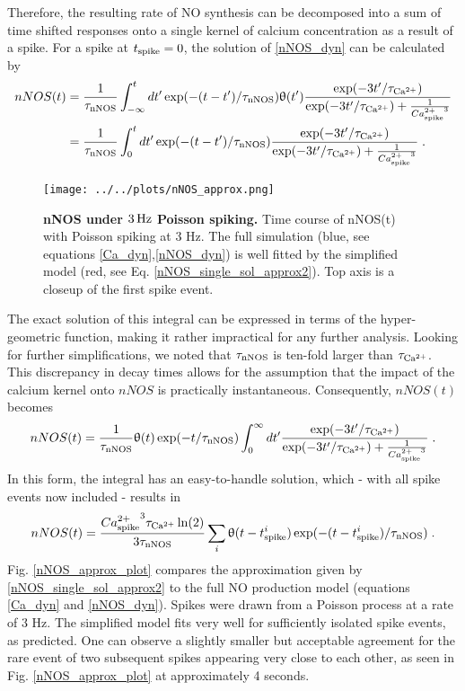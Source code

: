 \documentclass[10pt,letterpaper]{article}
\begin{document}
Therefore, the resulting rate of NO synthesis can be decomposed into a sum of time shifted responses onto a single kernel of calcium concentration as a result of a spike. For a spike at $t_{\rm spike}=0$, the solution of \eqref{nNOS_dyn} can be calculated by
\begin{equation}
\begin{split}
nNOS(t) &= \frac{1}{\tau_{\rm nNOS}}\int_{-\infty}^t dt' \exp(-(t-t')/\tau_{\rm nNOS}) \uptheta(t') \frac{\exp(-3t'/\tau_{\rm Ca^{2+}})}{\exp(-3t'/\tau_{\rm Ca^{2+}}) + \frac{1}{{Ca^{2+}_{\rm spike}}^3}} \\
&= \frac{1}{\tau_{\rm nNOS}}\int_{0}^t dt' \exp(-(t-t')/\tau_{\rm nNOS}) \frac{\exp(-3t'/\tau_{\rm Ca^{2+}})}{\exp(-3t'/\tau_{\rm Ca^{2+}}) + \frac{1}{{Ca^{2+}_{\rm spike}}^3}}\;.
\end{split}\label{nNOS_single_sol}
\end{equation}

\begin{figure}
\begin{center}
\texttt{[image: ../../plots/nNOS\_approx.png]}
\end{center}
\caption{{\bf nNOS under $\rm 3\, Hz$ Poisson spiking.} Time course of nNOS(t) with Poisson spiking at 3 Hz. The full simulation (blue, see equations \eqref{Ca_dyn},\eqref{nNOS_dyn}) is well fitted by the simplified model (red, see Eq. \eqref{nNOS_single_sol_approx2}). Top axis is a closeup of the first spike event.}
\end{figure}

The exact solution of this integral can be expressed in terms of the hyper-geometric function, making it rather impractical for any further analysis. Looking for further simplifications, we noted that $\tau_{\rm nNOS}$ is ten-fold larger than $\tau_{\rm Ca^{2+}}$. This discrepancy in decay times allows for the assumption that the impact of the calcium kernel onto $nNOS$ is practically instantaneous. Consequently, $nNOS(t)$ becomes
\begin{equation}
nNOS(t) = \frac{1}{\tau_{\rm nNOS}} \uptheta(t) \exp(-t/\tau_{\rm nNOS}) \int_{0}^\infty dt' \frac{\exp(-3t'/\tau_{\rm Ca^{2+}})}{\exp(-3t'/\tau_{\rm Ca^{2+}}) + \frac{1}{{Ca^{2+}_{\rm spike}}^3}}\;.
\label{nNOS_single_sol_approx1}
\end{equation}
In this form, the integral has an easy-to-handle solution, which - with all spike events now included - results in
\begin{equation}
nNOS(t) = \frac{{Ca^{2+}_{\rm spike}}^3 \tau_{\rm Ca^{2+}}\ln(2)}{3\tau_{\rm nNOS}} \sum_i \uptheta(t-t^i_{\rm spike}) \exp(-(t-t^i_{\rm spike})/\tau_{\rm nNOS})\;.
\label{nNOS_single_sol_approx2}
\end{equation}
Fig. \ref{nNOS_approx_plot} compares the approximation given by \eqref{nNOS_single_sol_approx2} to the full NO production model (equations \eqref{Ca_dyn} and \eqref{nNOS_dyn}). Spikes were drawn from a Poisson process at a rate of 3 Hz. The simplified model fits very well for sufficiently isolated spike events, as predicted. One can observe a slightly smaller but acceptable agreement for the rare event of two subsequent spikes appearing very close to each other, as seen in Fig. \ref{nNOS_approx_plot} at approximately 4 seconds.
\end{document}
